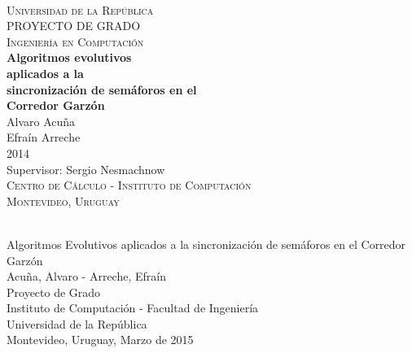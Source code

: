 \begin{titlepage}
  \thispagestyle{empty}
  \begin{center}
    ~\\[2.2cm]



    \textsc{\Huge Universidad de la República } \\[2.5cm]
    \textsc{\Huge PROYECTO DE GRADO } \\[0.5cm]
    \textsc{\Huge Ingeniería en Computación } \\[2.5cm]    
    \textbf{\Huge Algoritmos evolutivos} \\[0.2cm]
    \textbf{\Huge aplicados a la } \\[0.2cm]    
    \textbf{\Huge sincronización de semáforos en el } \\[0.3cm]
    \textbf{\Huge Corredor Garzón } \\[1.5cm]    
    
    {\huge Alvaro Acuña} \\[0.2cm]
    {\huge Efraín Arreche} \\[0.2cm]
    {\Large 2014} \\[2.0cm]
    {\Large Supervisor: Sergio Nesmachnow} \\[1.0cm]

    \textsc{\large Centro de Cálculo - Instituto de Computación} \\[0.2cm]
    \textsc{\large Montevideo, Uruguay} \\[1.5cm]

  \end{center}
  \vfill
\end{titlepage}
{
  \thispagestyle{empty}
  ~\\[16cm]
  Algoritmos Evolutivos aplicados a la sincronización de semáforos en el Corredor Garzón \\[0.05cm]
  Acuña, Alvaro - Arreche, Efraín \\[0.05cm]
  Proyecto de Grado \\[0.05cm]
  Instituto de Computación - Facultad de Ingeniería \\[0.05cm]
  Universidad de la República \\[0.05cm]
  Montevideo, Uruguay, Marzo de 2015 \\[0.05cm]
  \vfill
  \cleardoublepage
}
\setcounter{page}{1}